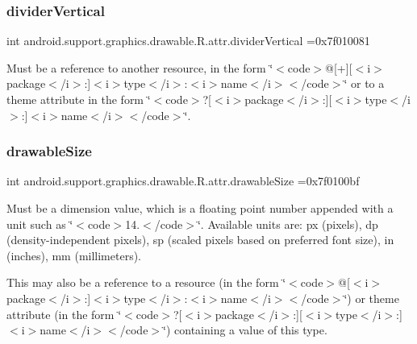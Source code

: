 \subsubsection{\texorpdfstring{divider\+Vertical}{dividerVertical}}
{\footnotesize\ttfamily int android.\+support.\+graphics.\+drawable.\+R.\+attr.\+divider\+Vertical =0x7f010081\hspace{0.3cm}{\ttfamily [static]}}

Must be a reference to another resource, in the form \char`\"{}$<$code$>$@\mbox{[}+\mbox{]}\mbox{[}$<$i$>$package$<$/i$>$\+:\mbox{]}$<$i$>$type$<$/i$>$\+:$<$i$>$name$<$/i$>$$<$/code$>$\char`\"{} or to a theme attribute in the form \char`\"{}$<$code$>$?\mbox{[}$<$i$>$package$<$/i$>$\+:\mbox{]}\mbox{[}$<$i$>$type$<$/i$>$\+:\mbox{]}$<$i$>$name$<$/i$>$$<$/code$>$\char`\"{}. \mbox{\label{classandroid_1_1support_1_1graphics_1_1drawable_1_1R_1_1attr_aebafbebda3c4a80447486a3ee731207a}} 
\subsubsection{\texorpdfstring{drawable\+Size}{drawableSize}}
{\footnotesize\ttfamily int android.\+support.\+graphics.\+drawable.\+R.\+attr.\+drawable\+Size =0x7f0100bf\hspace{0.3cm}{\ttfamily [static]}}

Must be a dimension value, which is a floating point number appended with a unit such as \char`\"{}$<$code$>$14.\+5sp$<$/code$>$\char`\"{}. Available units are\+: px (pixels), dp (density-\/independent pixels), sp (scaled pixels based on preferred font size), in (inches), mm (millimeters). 

This may also be a reference to a resource (in the form \char`\"{}$<$code$>$@\mbox{[}$<$i$>$package$<$/i$>$\+:\mbox{]}$<$i$>$type$<$/i$>$\+:$<$i$>$name$<$/i$>$$<$/code$>$\char`\"{}) or theme attribute (in the form \char`\"{}$<$code$>$?\mbox{[}$<$i$>$package$<$/i$>$\+:\mbox{]}\mbox{[}$<$i$>$type$<$/i$>$\+:\mbox{]}$<$i$>$name$<$/i$>$$<$/code$>$\char`\"{}) containing a value of this type. \mbox{\label{classandroid_1_1support_1_1graphics_1_1drawable_1_1R_1_1attr_ac627577ceb51f500b8595e1337dc20cd}} 
